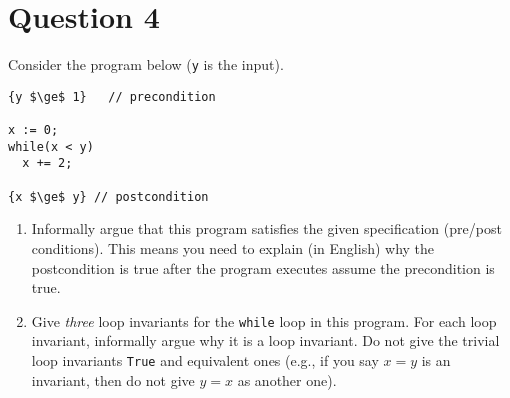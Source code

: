 \documentclass[10pt]{article}
\newcommand{\code}[1]{\texttt{#1}}
\begin{document}
\section{Question 4}

Consider the program below (\texttt{y} is the input). 
\begin{lstlisting}
{y $\ge$ 1}   // precondition

x := 0;
while(x < y)
  x += 2;

{x $\ge$ y} // postcondition
\end{lstlisting}


\begin{enumerate}
\item Informally argue that this program satisfies the given specification (pre/post conditions). This means you need to explain (in English) why the postcondition is true after the program executes assume the precondition is true.


\item Give \emph{three} loop invariants for the \code{while} loop in this program. For each loop invariant, informally argue why it is a loop invariant.  Do not give the trivial loop invariants \code{True} and equivalent ones (e.g., if you say $x = y$ is an invariant, then do not give $y = x$ as another one).


\end{enumerate}
\end{document}
